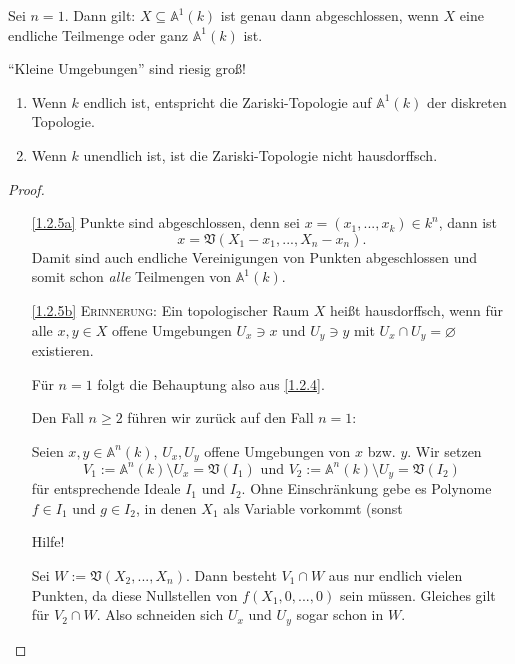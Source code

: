 \documentclass[a4paper,12pt]{scrbook}
\theoremstyle{keinenummern} %
\theoremstyle{mitnummern}
\theoremstyle{unserbeweis}
\newtheorem{proof}{Beweis}
\def\A{\mathbb{A}}
\def\V{\mathfrak{V}}
\newcommand{\leer}{\ensuremath{\varnothing}}
\renewcommand{\dotsc}{\ensuremath{\!...}}
\begin{document}
\begin{bsp}\label{1.2.4}
Sei $n=1$. Dann gilt: $X\subseteq\A^{1}(k)$ ist genau dann abgeschlossen, wenn $X$ eine endliche Teilmenge oder ganz $\A^{1}(k)$ ist.
\end{bsp}

\begin{w}\enquote{Kleine Umgebungen} sind riesig groß!\end{w}

\begin{bem}\label{1.2.5}
\begin{enumerate}
\item{} Wenn $k$ endlich ist, entspricht die Zariski-Topologie auf $\A^{1}(k)$ der diskreten Topologie.
\item{} Wenn $k$ unendlich ist, ist die Zariski-Topologie nicht hausdorffsch.
\end{enumerate}\end{bem}
\begin{proof}\begin{enumerate}
\item[\ref{1.2.5a}] Punkte sind abgeschlossen, denn sei $x=(x_{1},\dotsc,x_{k})\in k^{n}$, dann ist
\[{x}=\V(X_{1}-x_{1},\dotsc,X_{n}-x_{n}).\]
Damit sind auch endliche Vereinigungen von Punkten abgeschlossen und somit schon \emph{alle} Teilmengen von $\A^{1}(k)$.
\item[\ref{1.2.5b}] {\scshape Erinnerung:} Ein topologischer Raum $X$ heißt hausdorffsch, wenn für alle $x,y\in X$ offene Umgebungen $U_{x}\ni x$ und $U_{y}\ni y$ mit $U_{x}\cap U_{y}=\leer$ existieren.

Für $n=1$ folgt die Behauptung also aus \cref{1.2.4}.

Den Fall $n\geq 2$ führen wir zurück auf den Fall $n=1$:

Seien $x,y\in\A^{n}(k)$, $U_{x},U_{y}$ offene Umgebungen von $x$ bzw. $y$. Wir setzen
\[V_{1}:=\A^{n}(k)\setminus U_{x} = \V(I_{1})\text{ und }V_{2}:=\A^{n}(k)\setminus U_{y}=\V(I_{2})\]
für entsprechende Ideale $I_{1}$ und $I_{2}$. Ohne Einschränkung gebe es Polynome $f\in I_{1}$ und $g\in I_{2}$, in denen $X_{1}$ als Variable vorkommt (sonst

\begin{w}Hilfe!\end{w}

Sei $W:=\V(X_{2},\dotsc,X_{n})$. Dann besteht $V_{1}\cap W$ aus nur endlich vielen Punkten, da diese Nullstellen von $f(X_{1},0,\dotsc,0)$ sein müssen. Gleiches gilt für $V_{2}\cap W$. Also schneiden sich $U_{x}$ und $U_{y}$ sogar schon in $W$.
\end{enumerate}\end{proof}
\end{document}
